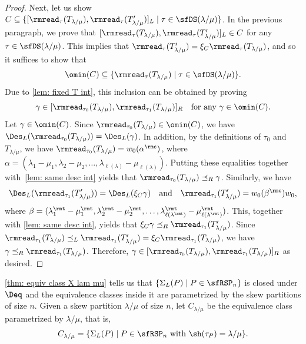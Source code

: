 \documentclass[12pt, reqno]{amsart}
\theoremstyle{definition}
\numberwithin{equation}{section} \numberwithin{figure}{section}
\numberwithin{table}{section}
\begin{document}
\begin{proof}
Next, let us show $C \subseteq \{[\rmread_{\tau}(T_{\lambda/\mu}), \rmread_{\tau}(T'_{\lambda/\mu})]_L \mid 
\tau \in \sfDS(\lambda/\mu) \}$.
In the previous paragraph, we prove that  $[\rmread_{\tau}(T_{\lambda/\mu}), \rmread_{\tau}(T'_{\lambda/\mu})]_L \in C$ for any $\tau \in \sfDS(\lambda/\mu)$.
This implies that $\rmread_{\tau}(T'_{\lambda/\mu}) = \xi_C \rmread_{\tau}(T_{\lambda/\mu})$, and so it suffices to show that
$$
\omin(C) \subseteq \{\rmread_\tau(T_{\lambda/\mu}) \mid \tau \in \sfDS(\lambda / \mu)\}.
$$
Due to \cref{lem: fixed T int}, 
this inclusion
can be obtained by proving 
$$
\gamma \in [\rmread_{\tau_0}(T_{\lambda/\mu}), \rmread_{\tau_1}(T_{\lambda/\mu})]_R \quad \text{for any $\gamma \in \omin(C)$.}
$$
Let $\gamma \in \omin(C)$.
Since $\rmread_{\tau_0}(T_{\lambda/\mu}) \in \omin(C)$, we have $\Des_L(\rmread_{\tau_0}(T_{\lambda/\mu})) = \Des_L(\gamma)$.
In addition, by the definitions of $\tau_0$ and $T_{\lambda/\mu}$, we have $\rmread_{\tau_0}(T_{\lambda/\mu}) = w_0(\alpha^\rmc)$, where  
$\alpha = (\lambda_1 - \mu_1, \lambda_2 - \mu_2, \ldots, \lambda_{\ell(\lambda)} - \mu_{\ell(\lambda)})$.
Putting these equalities together with~\cref{lem: same desc int} yields that $\rmread_{\tau_0}(T_{\lambda/\mu}) \preceq_{R} \gamma$.
Similarly, we have
\[
\Des_L(\rmread_{\tau_1}(T'_{\lambda/\mu})) = \Des_L(\xi_C\gamma)
\quad \text{and} \quad
\rmread_{\tau_1}(T'_{\lambda/\mu}) = w_0(\beta^\rmc)w_0,
\]
where $\beta = (\lambda^\rmt_1 - \mu^\rmt_1, \lambda^\rmt_2 - \mu^\rmt_2,
\ldots, \lambda^\rmt_{\ell(\lambda^\rmt)} - \mu^\rmt_{\ell(\lambda^\rmt)})$.
This, together with \cref{lem: same desc int}, yields that $\xi_C\gamma  \preceq_{R} \rmread_{\tau_1}(T'_{\lambda/\mu})$.
Since $\rmread_{\tau_1}(T_{\lambda/\mu}) \preceq_L  \rmread_{\tau_1}(T'_{\lambda/\mu}) = \xi_C \rmread_{\tau_1}(T_{\lambda/\mu})$, we have $\gamma \preceq_{R} \rmread_{\tau_1}(T_{\lambda/\mu})$.
Therefore, $\gamma \in [\rmread_{\tau_0}(T_{\lambda/\mu}), \rmread_{\tau_1}(T_{\lambda/\mu})]_R$ as desired.
\end{proof}




\cref{thm: equiv class X lam mu} tells us that
$\{\Sigma_L(P) \mid P \in \sfRSP_n \}$ is closed under $\Deq$ and the  equivalence classes inside it are parametrized by the skew partitions of size $n$.
Given a skew partition $\lambda/\mu$ of size $n$, 
let $C_{\lambda/\mu}$ be the equivalence class parametrized by $\lambda/\mu$, that is, 
\[
C_{\lambda/\mu} = \{\Sigma_L(P) \mid \text{$P \in \sfRSP_n$ with $\sh(\tau_P)= \lambda/\mu$} \}.
\]
\end{document}
